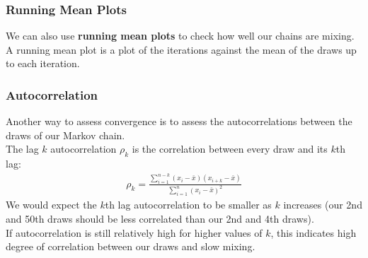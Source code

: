 \documentclass{beamer}
\begin{document}
\begin{frame}
\frametitle{Running Mean Plots}
\pause
We can also use \textbf{running mean plots} to check how well our
chains are mixing. \\
\pause
\bigskip
A running mean plot is a plot of the iterations against the mean of
the draws up to each iteration.
\pause

\begin{figure}[!htp]
\begin{center}
\end{center}
\end{figure}
\end{frame}

\begin{frame}
\frametitle{Autocorrelation}
\pause
Another way to assess convergence is to assess the autocorrelations
between the draws of our Markov chain.\\
\pause
\bigskip
The lag $k$ autocorrelation $\rho_k$ is the correlation between every draw and
its $k$th lag:
\pause
\begin{eqnarray*}
\rho_k = \frac{\sum_{i=1}^{n-k} (x_i - \bar{x})(x_{i+k} -
\bar{x})}{\sum_{i=1}^n (x_i - \bar{x})^2}
\end{eqnarray*}
\pause
We would expect the $k$th lag autocorrelation to be smaller as $k$
increases \pause (our 2nd and 50th draws should be less correlated
than our 2nd and 4th draws).\\
\pause
\bigskip
If autocorrelation is still relatively high for higher values of $k$,
this indicates high degree of correlation between our draws and slow mixing.
\end{frame}
\end{document}
